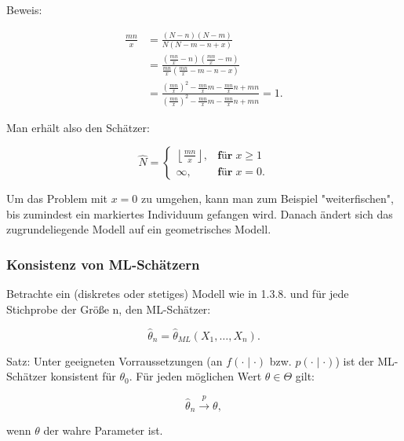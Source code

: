 \documentclass[10pt]{article}
\newcommand{\FZV}{X_1, \ldots, X_n} %
\newcommand{\KW}{\overset{p} \longrightarrow} %
\newenvironment{BSP}[1][]
{\begin{Beispiel}[frametitle=#1]}{\end{Beispiel}}
\begin{document}
\begin{BSP}[Beispiel 1.0000 Schätzung der Populationsgröße mit der Capture/Recapture-Methode]
		Beweis:
		
		\begin{equation*}
			\begin{split}
				\frac{mn}{x} &= \frac{(N-n)(N-m)}{N(N-m-n+x)}\\  
				&= \frac{\left(\frac{mn}{x}-n\right)\left(\frac{mn}{x} -m\right)}{\frac{mn}{x}\left(\frac{mn}{x}-m-n-x\right)}\\
				&= \frac{\left(\frac{mn}{x}\right)^2 -\frac{mn}{x}m -\frac{mn}{x}n +mn} {\left(\frac{mn}{x}\right)^2 - \frac{mn}{x}m -\frac{mn}{x}n + mn} =1.
			\end{split}
		\end{equation*}
		
		Man erhält also den Schätzer:
		
		\begin{equation*}
			\hat{N} = 
			\begin{cases}
				\left\lfloor \frac{mn}{x} \right\rfloor, &\textbf{für} \; x \geq 1 \\
				\infty,  &\textbf{für} \; x =0.
			\end{cases}
		\end{equation*}
		
		Um das Problem mit $x=0$ zu umgehen, kann man zum Beispiel "weiterfischen", bis zumindest ein markiertes Individuum gefangen wird. Danach ändert sich das zugrundeliegende Modell auf ein geometrisches Modell. 
	\end{BSP}
	
	\subsubsection{Konsistenz von ML-Schätzern}
	
	Betrachte ein (diskretes oder stetiges) Modell wie in 1.3.8. und für jede Stichprobe der Größe n, den ML-Schätzer:
	
	\begin{equation*}
		\hat{\theta}_n = \hat{\theta}_{ML}(\FZV).
	\end{equation*}
	
	Satz: Unter geeigneten Vorraussetzungen (an $f(\cdot \mid \cdot)$ bzw. $p(\cdot \mid \cdot)$) ist der ML-Schätzer konsistent für $\theta_0$. Für jeden möglichen Wert $\theta \in \Theta$ gilt:
	
	\begin{equation*}
		\hat{\theta}_n \KW \theta,
	\end{equation*}
	
	wenn $\theta$ der wahre Parameter ist. 
	
\end{document}
